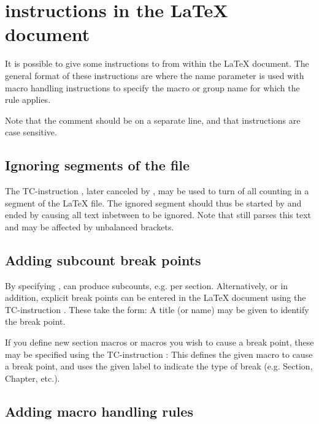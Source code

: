 \documentclass{article}
\begin{document}
\section{\TeXcount{} instructions in the \LaTeX{} document}

It is possible to give some instructions to \TeXcount{} from within the
\LaTeX{} document. The general format of these instructions are
where the name parameter is used with macro handling instructions to specify the macro or group name for which the rule applies.

Note that the comment should be on a separate line, and that instructions are case sensitive.

\subsection{Ignoring segments of the file}

The TC-instruction , later canceled by , may be used to turn of all counting in a segment of the \LaTeX{} file. The ignored segment should thus be started by
and ended by
causing all text inbetween to be ignored. Note that \TeXcount{} still parses this text and may be affected by unbalanced brackets.

\subsection{Adding subcount break points}

By specifying , \TeXcount{} can produce subcounts, e.g. per section. Alternatively, or in addition, explicit break points can be entered in the \LaTeX{} document using the TC-instruction . These take the form:
A title (or name) may be given to identify the break point.

If you define new section macros or macros you wish to cause a break point, these may be specified using the TC-instruction :
This defines the given macro to cause a break point, and uses the given label to indicate the type of break (e.g. Section, Chapter, etc.).

\subsection{Adding macro handling rules}
\end{document}
